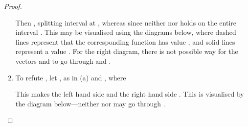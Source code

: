 \documentclass[12pt]{article}
\theoremstyle{definition}
\begin{document}
\begin{proof}
\begin{enumerate}
Then , splitting interval  at , whereas
 since neither  nor  holds on the entire
interval . This may be visualised using the diagrams below, where
dashed lines represent that the corresponding function has value ,
and solid lines represent a value . For the right diagram, there is
not possible way for the vectors  and  to go through  and
. 
\begin{center}
\end{center}
\item To refute , let ,
   as in (a) and , where
  
  This makes the left hand side   and the right hand side . This
  is visualised by the diagram below---neither  nor  may
  go through . 
  

\end{enumerate}
\end{proof}
\end{document}
